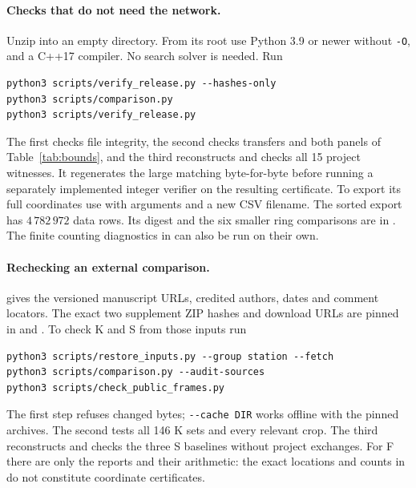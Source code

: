 \paragraph{Checks that do not need the network.} Unzip into an empty directory. From its root use Python 3.9 or newer without \verb|-O|, and a C++17 compiler. No search solver is needed. Run
\begin{verbatim}
python3 scripts/verify_release.py --hashes-only
python3 scripts/comparison.py
python3 scripts/verify_release.py
\end{verbatim}
The first checks file integrity, the second checks transfers and both panels of Table~\ref{tab:bounds}, and the third reconstructs and checks all 15 project witnesses. It regenerates the large matching byte-for-byte before running a separately implemented integer verifier on the resulting certificate. To export its full coordinates use  with arguments  and a new CSV filename. The sorted export has $4\,782\,972$ data rows. Its digest and the six smaller ring comparisons are in . The finite counting diagnostics in  can also be run on their own.

\paragraph{Rechecking an external comparison.}  gives the versioned manuscript URLs, credited authors, dates and comment locators. The exact two supplement ZIP hashes and download URLs are pinned in  and . To check K and S from those inputs run
\begin{verbatim}
python3 scripts/restore_inputs.py --group station --fetch
python3 scripts/comparison.py --audit-sources
python3 scripts/check_public_frames.py
\end{verbatim}
The first step refuses changed bytes; \verb|--cache DIR| works offline with the pinned archives. The second tests all 146 K sets and every relevant crop. The third reconstructs and checks the three S baselines without project exchanges. For F there are only the reports and their arithmetic: the exact locations and counts in  do not constitute coordinate certificates.
